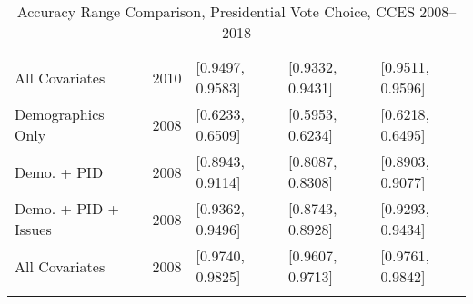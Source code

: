 \begin{longtable}{lrlll}
  All Covariates & 2010 & [0.9497, 0.9583] & [0.9332, 0.9431] & [0.9511, 0.9596] \\ 
  Demographics Only & 2008 & [0.6233, 0.6509] & [0.5953, 0.6234] & [0.6218, 0.6495] \\ 
  Demo. + PID & 2008 & [0.8943, 0.9114] & [0.8087, 0.8308] & [0.8903, 0.9077] \\ 
  Demo. + PID + Issues & 2008 & [0.9362, 0.9496] & [0.8743, 0.8928] & [0.9293, 0.9434] \\ 
  All Covariates & 2008 & [0.9740, 0.9825] & [0.9607, 0.9713] & [0.9761, 0.9842] \\ 
   \bottomrule
\caption{Accuracy Range Comparison, Presidential Vote Choice, CCES 2008--2018} 
\label{tab:CCES_1_accuracy}
\end{longtable}
